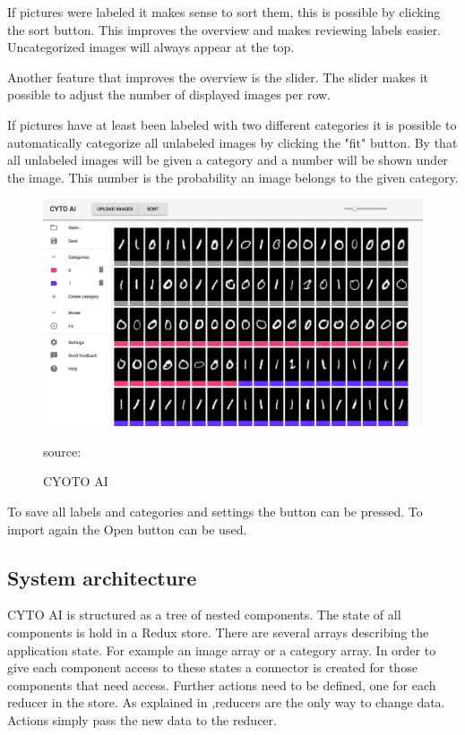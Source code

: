 If pictures were labeled it makes sense to sort them, this is possible by clicking the sort button. This improves the overview and makes reviewing labels easier. Uncategorized images will always appear at the top.

Another feature that improves the overview is the slider. The slider makes it possible to adjust the number of displayed images per row. 

If pictures have at least been labeled with two different categories it is possible to automatically categorize all unlabeled images by clicking the "fit" button. By that all unlabeled images will be given a category and a number will be shown under the image. This number is the probability an image belongs to the given category.

\begin{figure}[H]
	\centering
	\includegraphics[width=0.8\linewidth]{bilder/cyto/cyto.png}
	\caption{CYOTO AI} source:\cite{Component}
	\label{fig:COMPONENT}
\end{figure}

To save all labels and categories and settings the button can be pressed. To import again the Open button can be used.


\subsection{System architecture}
CYTO AI is structured as a tree of nested components. The state of all components is hold in a Redux store. There are several arrays describing the application state. For example an image array or a category array. In order to give each component access to these states a connector is created for those components that need access. Further actions need to be defined, one for each reducer in the store. As explained in ,reducers are the only way to change data. Actions simply pass the new data to the reducer.


